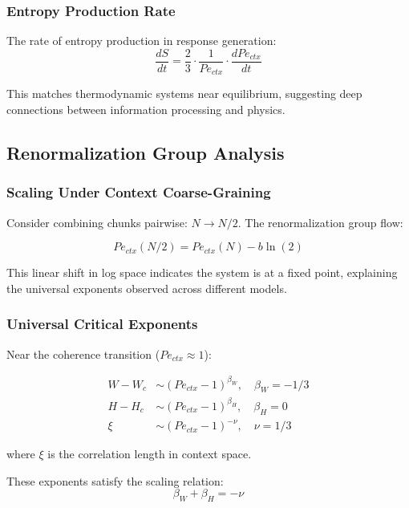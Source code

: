 \documentclass[conference]{IEEEtran}
\begin{document}
\subsubsection{Entropy Production Rate}

The rate of entropy production in response generation:
\begin{equation}
\frac{dS}{dt} = \frac{2}{3} \cdot \frac{1}{Pe_{ctx}} \cdot \frac{dPe_{ctx}}{dt}
\end{equation}

This matches thermodynamic systems near equilibrium, suggesting deep connections between information processing and physics.

\subsection{Renormalization Group Analysis}

\subsubsection{Scaling Under Context Coarse-Graining}

Consider combining chunks pairwise: $N \rightarrow N/2$. The renormalization group flow:

\begin{equation}
Pe_{ctx}(N/2) = Pe_{ctx}(N) - b\ln(2)
\end{equation}

This linear shift in log space indicates the system is at a fixed point, explaining the universal exponents observed across different models.

\subsubsection{Universal Critical Exponents}

Near the coherence transition ($Pe_{ctx} \approx 1$):

\begin{align}
W - W_c &\sim (Pe_{ctx} - 1)^{\beta_W}, \quad \beta_W = -1/3 \\
H - H_c &\sim (Pe_{ctx} - 1)^{\beta_H}, \quad \beta_H = 0 \\
\xi &\sim (Pe_{ctx} - 1)^{-\nu}, \quad \nu = 1/3
\end{align}

where $\xi$ is the correlation length in context space.

These exponents satisfy the scaling relation:
\begin{equation}
\beta_W + \beta_H = -\nu
\end{equation}
\end{document}
